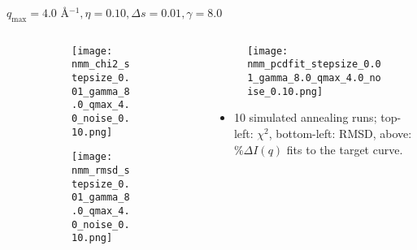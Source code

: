 \documentclass{beamer}
\begin{document}
\begin{frame}{$ q_{\textrm{max}}=4.0 $ \AA $^{-1}, \eta=0.10, \Delta s=0.01, \gamma=8.0$}
	\begin{columns}
		\begin{column}{.5\textwidth}
			\begin{figure}[H]
			\centering
			\begin{subfigure}[b]{\textwidth}
				\centering
				\texttt{[image: nmm\_chi2\_stepsize\_0.01\_gamma\_8.0\_qmax\_4.0\_noise\_0.10.png]}
				\label{fig:}
			\end{subfigure}
			\begin{subfigure}[b]{\textwidth}
				\centering
				\texttt{[image: nmm\_rmsd\_stepsize\_0.01\_gamma\_8.0\_qmax\_4.0\_noise\_0.10.png]}
				\label{fig:}
			\end{subfigure}
			\end{figure}
		\end{column}
		\begin{column}{.5\textwidth}
			\begin{figure}[H]
				\centering
				\texttt{[image: nmm\_pcdfit\_stepsize\_0.01\_gamma\_8.0\_qmax\_4.0\_noise\_0.10.png]}
				\label{fig:}
			\end{figure}
			\begin{itemize}
				\item 10 simulated annealing runs; top-left: $\chi^2$, bottom-left: RMSD, above: $\%\Delta I(q)$ fits to the target curve.
			\end{itemize}
		\end{column}
	\end{columns}
\end{frame}
 
\end{document}
